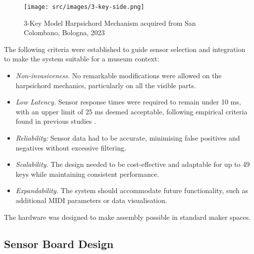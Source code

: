 \begin{figure}[b]
    \centering
    \texttt{[image: src/images/3-key-side.png]}
    \caption{3-Key Model Harpsichord Mechanism acquired from San Colombano, Bologna, 2023}
    \label{fig:3key}
\end{figure}



The following criteria were established to guide sensor selection and integration to make the system suitable for a museum context:

\begin{itemize}
    \item \emph{Non-invasiveness.} No remarkable modifications were allowed on the harpsichord mechanics, particularly on all the visible parts.
    \item \emph{Low Latency.} Sensor response times were required to remain under 10 ms, with an upper limit of 25 ms deemed acceptable, following empirical criteria found in previous studies \cite{Jack2016}.
    \item \emph{Reliability:} Sensor data had to be accurate, minimising false positives and negatives without excessive filtering.
    \item \emph{Scalability.} The design needed to be cost-effective and adaptable for up to 49 keys while maintaining consistent performance.
    \item \emph{Expandability.} The system should accommodate future functionality, such as additional MIDI parameters or data visualisation.
\end{itemize}

The hardware was designed to make assembly possible in standard maker spaces.  

\subsection{Sensor Board Design}\label{sensor-board}

